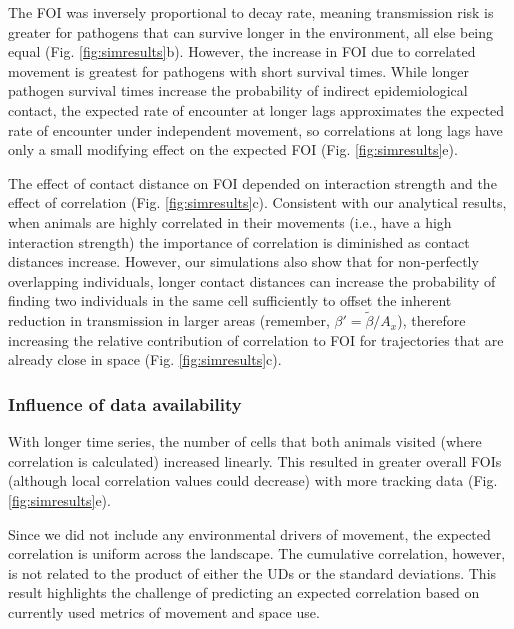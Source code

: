 ﻿\documentclass[11pt]{article}
\begin{document}
The FOI was inversely proportional to decay rate, meaning transmission risk is greater for pathogens that can survive longer in the environment, all else being equal (Fig. \ref{fig:simresults}b).
However, the increase in FOI due to correlated movement is greatest for pathogens with short survival times. While longer pathogen survival times increase the probability of indirect epidemiological contact, the expected rate of encounter at longer lags approximates the expected rate of encounter under independent movement, so correlations at long lags have only a small modifying effect on the expected FOI (Fig. \ref{fig:simresults}e). 

The effect of contact distance on FOI depended on interaction strength and the effect of correlation (Fig. \ref{fig:simresults}c). Consistent with our analytical results, when animals are highly correlated in their movements (i.e., have a high interaction strength) the importance of correlation is diminished as contact distances increase.
However, our simulations also show that for non-perfectly overlapping individuals, longer contact distances can increase the probability of finding two individuals in the same cell sufficiently to offset the inherent reduction in transmission in larger areas (remember, $\beta' = \tilde{\beta} / A_x$), therefore increasing the relative contribution of correlation to FOI for trajectories that are already close in space (Fig. \ref{fig:simresults}c).

\subsubsection*{Influence of data availability}

 
With longer time series, the number of cells that both animals visited (where correlation is calculated) increased linearly. This resulted in greater overall FOIs (although local correlation values could decrease) with more tracking data (Fig. \ref{fig:simresults}e). 

Since we did not include any environmental drivers of movement, the expected correlation is uniform across the landscape. The cumulative correlation, however, is not related to the product of either the UDs or the standard deviations. This result highlights the challenge of predicting an expected correlation based on currently used metrics of movement and space use.

\end{document}
